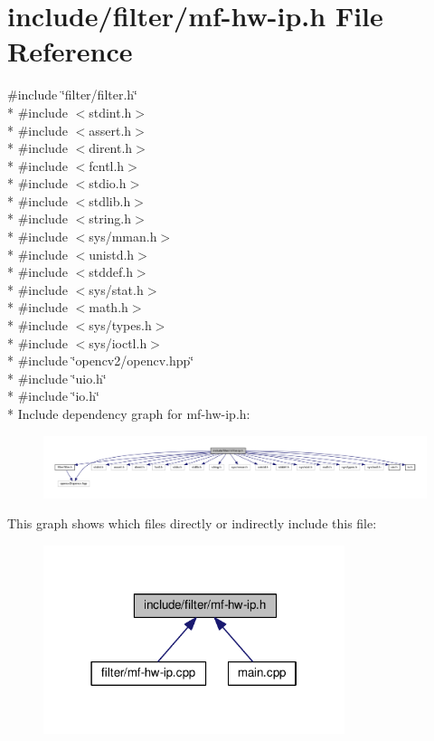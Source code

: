 \hypertarget{mf-hw-ip_8h}{}\section{include/filter/mf-\/hw-\/ip.h File Reference}
\label{mf-hw-ip_8h}
{\ttfamily \#include \char`\"{}filter/filter.\+h\char`\"{}}\\*
{\ttfamily \#include $<$stdint.\+h$>$}\\*
{\ttfamily \#include $<$assert.\+h$>$}\\*
{\ttfamily \#include $<$dirent.\+h$>$}\\*
{\ttfamily \#include $<$fcntl.\+h$>$}\\*
{\ttfamily \#include $<$stdio.\+h$>$}\\*
{\ttfamily \#include $<$stdlib.\+h$>$}\\*
{\ttfamily \#include $<$string.\+h$>$}\\*
{\ttfamily \#include $<$sys/mman.\+h$>$}\\*
{\ttfamily \#include $<$unistd.\+h$>$}\\*
{\ttfamily \#include $<$stddef.\+h$>$}\\*
{\ttfamily \#include $<$sys/stat.\+h$>$}\\*
{\ttfamily \#include $<$math.\+h$>$}\\*
{\ttfamily \#include $<$sys/types.\+h$>$}\\*
{\ttfamily \#include $<$sys/ioctl.\+h$>$}\\*
{\ttfamily \#include \char`\"{}opencv2/opencv.\+hpp\char`\"{}}\\*
{\ttfamily \#include \char`\"{}uio.\+h\char`\"{}}\\*
{\ttfamily \#include \char`\"{}io.\+h\char`\"{}}\\*
Include dependency graph for mf-\/hw-\/ip.h\+:
\nopagebreak
\begin{figure}[H]
\begin{center}
\leavevmode
\includegraphics[width=350pt]{mf-hw-ip_8h__incl}
\end{center}
\end{figure}
This graph shows which files directly or indirectly include this file\+:
\nopagebreak
\begin{figure}[H]
\begin{center}
\leavevmode
\includegraphics[width=250pt]{mf-hw-ip_8h__dep__incl}
\end{center}
\end{figure}
